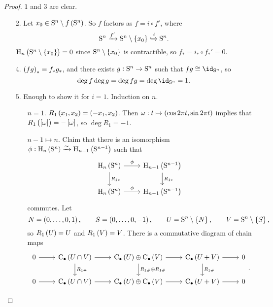 \begin{proof}
$ 1 $ and $ 3 $ are clear.
\begin{itemize}
\item[$ 2 $.] Let $ x_0 \in \S^n \setminus f\br{\S^n} $. So $ f $ factors as $ f = i \circ f' $, where
$$ \S^n \xrightarrow{f'} \S^n \setminus \cbr{x_0} \xhookrightarrow{i} \S^n. $$
$ \H_n\br{\S^n \setminus \cbr{x_0}} = 0 $ since $ \S^n \setminus \cbr{x_0} $ is contractible, so $ f_* = i_* \circ f_*' = 0 $.
\item[$ 4 $.] $ \br{fg}_* = f_*g_* $, and there exists $ g : \S^n \to \S^n $ such that $ fg \cong \id_{\S^n} $, so
$$ \deg f\deg g = \deg fg = \deg \id_{\S^n} = 1. $$
\item[$ 5 $.] Enough to show it for $ i = 1 $. Induction on $ n $.
\begin{itemize}[leftmargin=0.5in]
\item[$ n = 1 $.] $ R_1\br{x_1, x_2} = \br{-x_1, x_2} $. Then $ \omega : t \mapsto \br{\cos 2\pi t, \sin 2\pi t} $ implies that $ R_1\br{\sbr{\omega}} = -\sbr{\omega} $, so $ \deg R_1 = -1 $.
\item[$ n - 1 \mapsto n $.] Claim that there is an isomorphism $ \phi : \H_n\br{\S^n} \xrightarrow{\sim} \H_{n - 1}\br{\S^{n - 1}} $ such that
$$
\begin{tikzcd}
\H_n\br{\S^n} \arrow{r}{\phi} \arrow{d}{R_{1*}} & \H_{n - 1}\br{\S^{n - 1}} \arrow{d}{R_{1*}} \\
\H_n\br{\S^n} \arrow{r}{\phi} & \H_{n - 1}\br{\S^{n - 1}}
\end{tikzcd}
$$
commutes. Let
$$ N = \br{0, \dots, 0, 1}, \qquad S = \br{0, \dots, 0, -1}, \qquad U = \S^n \setminus \cbr{N}, \qquad V = \S^n \setminus \cbr{S}, $$
so $ R_1\br{U} = U $ and $ R_1\br{V} = V $. There is a commutative diagram of chain maps
$$
\begin{tikzcd}
0 \arrow{r} & \C_\bullet\br{U \cap V} \arrow{r} \arrow{d}{R_{1\#}} & \C_\bullet\br{U} \oplus \C_\bullet\br{V} \arrow{r} \arrow{d}{R_{1\#} \oplus R_{1\#}} & \C_\bullet\br{U + V} \arrow{r} \arrow{d}{R_{1\#}} & 0 \\
0 \arrow{r} & \C_\bullet\br{U \cap V} \arrow{r} & \C_\bullet\br{U} \oplus \C_\bullet\br{V} \arrow{r} & \C_\bullet\br{U + V} \arrow{r} & 0
\end{tikzcd}.
$$

\pagebreak


\end{itemize}
\end{itemize}
\end{proof}
